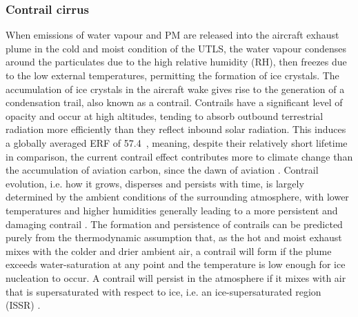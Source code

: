 \subsubsection{Contrail cirrus}
When emissions of water vapour and PM are released into the aircraft exhaust plume in the cold and moist condition of the UTLS, the water vapour condenses around the particulates due to the high relative humidity (RH), then freezes due to the low external temperatures, permitting the formation of ice crystals. The accumulation of ice crystals in the aircraft wake gives rise to the generation of a condensation trail, also known as a contrail. Contrails have a significant level of opacity and occur at high altitudes, tending to absorb outbound terrestrial radiation more efficiently than they reflect inbound solar radiation. This induces a globally averaged ERF of 57.4~, meaning, despite their relatively short lifetime in comparison, the current contrail effect contributes more to climate change than the accumulation of aviation carbon, since the dawn of aviation \cite{Burkhardt2011}. Contrail evolution, i.e. how it grows, disperses and persists with time, is largely determined by the ambient conditions of the surrounding atmosphere, with lower temperatures and higher humidities generally leading to a more persistent and damaging contrail \cite{Schumann2005}. The formation and persistence of contrails can be predicted purely from the thermodynamic assumption that, as the hot and moist exhaust mixes with the colder and drier ambient air, a contrail will form if the plume exceeds water-saturation at any point and the temperature is low enough for ice nucleation to occur. A contrail will persist in the atmosphere if it mixes with air that is supersaturated with respect to ice, i.e. an ice-supersaturated region (ISSR) \cite{Karcher2018}. 

